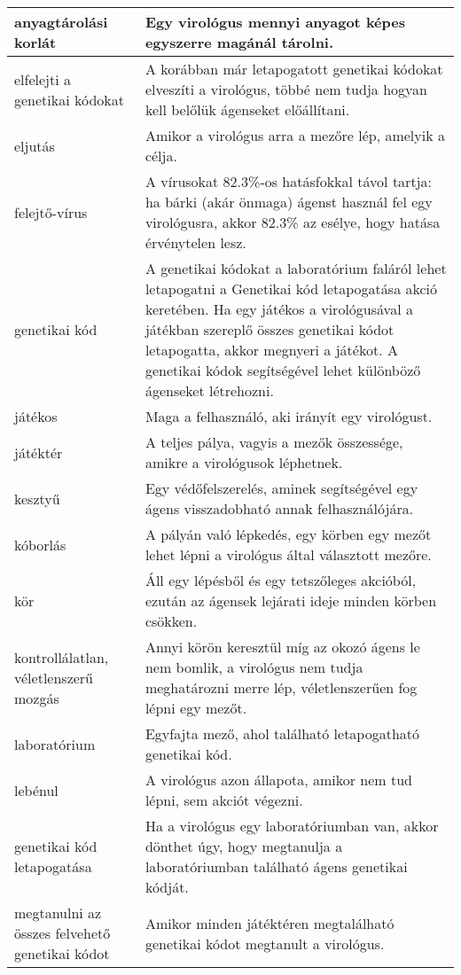 \begin{xltabular}{\textwidth}{|l|X|}
	\hline
	anyagtárolási korlát & Egy virológus mennyi anyagot képes egyszerre magánál tárolni. \\
	\hline
	elfelejti a genetikai kódokat & A korábban már letapogatott genetikai kódokat elveszíti a virológus, többé nem tudja hogyan kell belőlük ágenseket előállítani. \\
	\hline
	eljutás & Amikor a virológus arra a mezőre lép, amelyik a célja.  \\
	\hline
	felejtő-vírus & A vírusokat 82.3\%-os hatásfokkal távol tartja: ha bárki (akár önmaga)  ágenst használ fel egy virológusra, akkor 82.3\% az esélye, hogy hatása érvénytelen lesz. \\
	\hline
	genetikai kód & A genetikai kódokat a laboratórium faláról lehet letapogatni a Genetikai kód letapogatása akció keretében. Ha egy játékos a virológusával a játékban szereplő összes genetikai kódot letapogatta, akkor megnyeri a játékot. A genetikai kódok segítségével lehet különböző ágenseket létrehozni.  \\
	\hline
	játékos & Maga a felhasználó, aki irányít egy virológust. \\
	\hline
	játéktér & A teljes pálya, vagyis a mezők összessége, amikre a virológusok léphetnek. \\
	\hline
	kesztyű & Egy védőfelszerelés, aminek segítségével egy ágens visszadobható annak felhasználójára. \\
	\hline
	kóborlás & A pályán való lépkedés, egy körben egy mezőt lehet lépni a virológus által választott mezőre. \\
	\hline
	kör & Áll egy lépésből és egy tetszőleges akcióból, ezután az ágensek lejárati ideje minden körben csökken. \\
	\hline
	kontrollálatlan, véletlenszerű mozgás & Annyi körön keresztül míg az okozó ágens le nem bomlik, a virológus nem tudja meghatározni merre lép, véletlenszerűen fog lépni egy mezőt. \\
	\hline
	laboratórium & Egyfajta mező, ahol található letapogatható genetikai kód. \\
	\hline
	lebénul & A virológus azon állapota, amikor nem tud lépni, sem akciót végezni. \\
	\hline
	genetikai kód letapogatása & Ha a virológus egy laboratóriumban van, akkor dönthet úgy, hogy megtanulja a laboratóriumban található ágens genetikai kódját. \\
	\hline
	megtanulni az összes felvehető genetikai kódot & Amikor minden játéktéren megtalálható genetikai kódot megtanult a virológus. \\

\end{xltabular}
